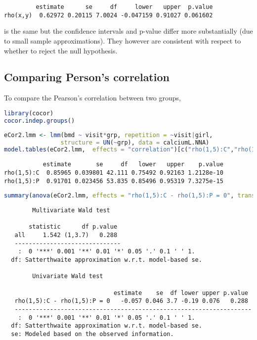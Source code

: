 \documentclass[12pt]{article}
\begin{document}
\label{}
\begin{verbatim}
         estimate      se     df     lower   upper  p.value
rho(x,y)  0.62972 0.20115 7.0024 -0.047159 0.91027 0.061602
\end{verbatim}


is the same but the confidence intervals and p-value differ more
substantially (due to small sample approximations). They however are
consistent with respect to whether to reject the null hypothesis.

\clearpage
\subsection{Comparing Person's correlation}
\label{sec:org910e089}


To compare the Pearson's correlation between two groups,
\begin{lstlisting}[language=r,numbers=none]
library(cocor)
cocor.indep.groups()
\end{lstlisting}


\begin{lstlisting}[language=r,numbers=none]
eCor2.lmm <- lmm(bmd ~ visit*grp, repetition = ~visit|girl,
                structure = UN(~grp), data = calciumL.NNA)
model.tables(eCor2.lmm,  effects = "correlation")[c("rho(1,5):C","rho(1,5):P"),]
\end{lstlisting}

\label{}
\begin{verbatim}
           estimate       se     df   lower   upper    p.value
rho(1,5):C  0.85965 0.039801 42.111 0.75492 0.92163 1.2128e-10
rho(1,5):P  0.91701 0.023456 53.835 0.85496 0.95319 7.3275e-15
\end{verbatim}


\begin{lstlisting}[language=r,numbers=none]
summary(anova(eCor2.lmm, effects = "rho(1,5):C - rho(1,5):P = 0", transform.rho = "none"))
\end{lstlisting}

\label{}
\begin{verbatim}
		Multivariate Wald test 

       statistic      df p.value  
   all     1.542 (1,3.7)   0.288  
   ------------------------------ 
    :  0 '***' 0.001 '**' 0.01 '*' 0.05 '.' 0.1 ' ' 1.
  df: Satterthwaite approximation w.r.t. model-based se. 

		Univariate Wald test 

                               estimate    se  df lower upper p.value  
   rho(1,5):C - rho(1,5):P = 0   -0.057 0.046 3.7 -0.19 0.076   0.288  
   ------------------------------------------------------------------- 
    :  0 '***' 0.001 '**' 0.01 '*' 0.05 '.' 0.1 ' ' 1.
  df: Satterthwaite approximation w.r.t. model-based se. 
  se: Modeled based on the observed information.
\end{verbatim}
\end{document}
